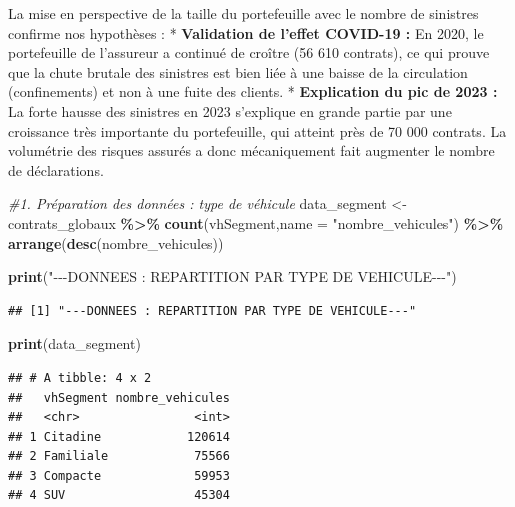 \documentclass[
]{article}
\newenvironment{Shaded}{\begin{snugshade}}{\end{snugshade}}
\newcommand{\AttributeTok}[1]{\textcolor[rgb]{0.13,0.29,0.53}{#1}}
\newcommand{\CommentTok}[1]{\textcolor[rgb]{0.56,0.35,0.01}{\textit{#1}}}
\newcommand{\FunctionTok}[1]{\textcolor[rgb]{0.13,0.29,0.53}{\textbf{#1}}}
\newcommand{\NormalTok}[1]{#1}
\newcommand{\OtherTok}[1]{\textcolor[rgb]{0.56,0.35,0.01}{#1}}
\newcommand{\SpecialCharTok}[1]{\textcolor[rgb]{0.81,0.36,0.00}{\textbf{#1}}}
\newcommand{\StringTok}[1]{\textcolor[rgb]{0.31,0.60,0.02}{#1}}
\begin{document}
La mise en perspective de la taille du portefeuille avec le nombre de
sinistres confirme nos hypothèses : * \textbf{Validation de l'effet
COVID-19 :} En 2020, le portefeuille de l'assureur a continué de croître
(56 610 contrats), ce qui prouve que la chute brutale des sinistres est
bien liée à une baisse de la circulation (confinements) et non à une
fuite des clients. * \textbf{Explication du pic de 2023 :} La forte
hausse des sinistres en 2023 s'explique en grande partie par une
croissance très importante du portefeuille, qui atteint près de 70 000
contrats. La volumétrie des risques assurés a donc mécaniquement fait
augmenter le nombre de déclarations.

\begin{Shaded}
\begin{Highlighting}[]
\CommentTok{\#1. Préparation des données : type de véhicule}
\NormalTok{data\_segment }\OtherTok{\textless{}{-}}\NormalTok{ contrats\_globaux }\SpecialCharTok{\%\textgreater{}\%} 
  \FunctionTok{count}\NormalTok{(vhSegment,}\AttributeTok{name =} \StringTok{"nombre\_vehicules"}\NormalTok{) }\SpecialCharTok{\%\textgreater{}\%}
  \FunctionTok{arrange}\NormalTok{(}\FunctionTok{desc}\NormalTok{(nombre\_vehicules))}

\FunctionTok{print}\NormalTok{(}\StringTok{"{-}{-}{-}DONNEES : REPARTITION PAR TYPE DE VEHICULE{-}{-}{-}"}\NormalTok{)}
\end{Highlighting}
\end{Shaded}

\begin{verbatim}
## [1] "---DONNEES : REPARTITION PAR TYPE DE VEHICULE---"
\end{verbatim}

\begin{Shaded}
\begin{Highlighting}[]
\FunctionTok{print}\NormalTok{(data\_segment)}
\end{Highlighting}
\end{Shaded}

\begin{verbatim}
## # A tibble: 4 x 2
##   vhSegment nombre_vehicules
##   <chr>                <int>
## 1 Citadine            120614
## 2 Familiale            75566
## 3 Compacte             59953
## 4 SUV                  45304
\end{verbatim}
\end{document}
